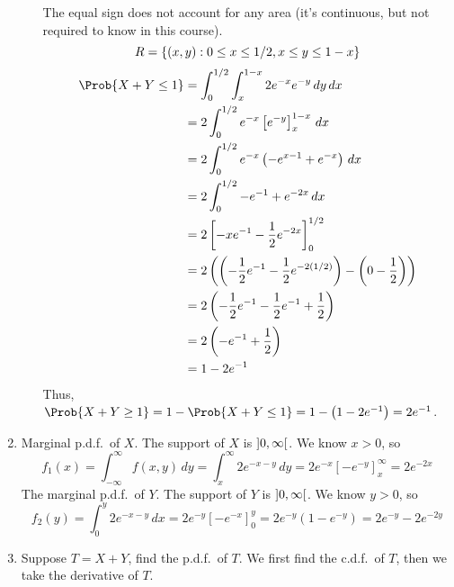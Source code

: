 \begin{Example}{}{}
\begin{enumerate}[label=(\roman*)]
\begin{enumerate}[label=(\alph*)]
                        The equal sign does not account for any area (it's continuous,
                        but not required to know in this course).
                        \[ R=\{(x,y):0\le x\le 1/2,x\le y\le 1-x\} \]
                        \begin{align*}
                            \Prob{X+Y\le 1}
                             & =\int_{0}^{1/2} \int_{x}^{1-x} 2e^{-x}e^{-y}\, d{y} \, d{x}         \\
                             & =2\int_{0}^{1/2} e^{-x}\left[ e^{-y} \right]_{x}^{1-x}\, d{x}       \\
                             & =2 \int_{0}^{1/2} e^{-x}\left( -e^{x-1}+e^{-x} \right)\, d{x}       \\
                             & =2 \int_{0}^{1/2} -e^{-1}+e^{-2x}\, d{x}                            \\
                             & =2 \left[ -xe^{-1}-\frac{1}{2} e^{-2x} \right]_0^{1/2}              \\
                             & =2\left( \left( -\frac{1}{2} e^{-1}-\frac{1}{2} e^{-2(1/2)} \right)
                            -\left( 0-\frac{1}{2} \right) \right)                                  \\
                             & =2\left( -\frac{1}{2} e^{-1}-\frac{1}{2} e^{-1}+\frac{1}{2}
                            \right)                                                                \\
                             & =2\left( -e^{-1}+\frac{1}{2} \right)                                \\
                             & =1-2e^{-1}
                        \end{align*}
                        Thus, $ \Prob{X+Y\ge 1}
                            =1-\Prob{X+Y\le 1}
                            =1-\left( 1-2e^{-1} \right)=2e^{-1} $.
              \end{enumerate}
        \item Marginal p.d.f.\ of $ X $. The support of $ X $ is
              $ \interval[open]{0}{\infty} $. We know $ x>0 $, so
              \[ f_1(x)=
                  \int_{-\infty}^{\infty} f(x,y)\, d{y}
                  =\int_{x}^{\infty} 2e^{-x-y}\, d{y}
                  =2e^{-x}\left[ -e^{-y} \right]_x^\infty=2e^{-2x} \]
              The marginal p.d.f.\ of $ Y $. The support of $ Y $ is
              $ \interval[open]{0}{\infty} $. We know $ y>0 $, so
              \[ f_2(y)=
                  \int_{0}^{y}2e^{-x-y}\, d{x} =
                  2e^{-y}\left[ -e^{-x} \right]_0^y
                  =2e^{-y}\left( 1-e^{-y} \right)=
                  2e^{-y}-2e^{-2y} \]
        \item Suppose $ T=X+Y $, find the p.d.f.\ of $ T $.
              We first find the c.d.f.\ of $ T $, then we take the derivative
              of $ T $.


\end{enumerate}
\end{Example}
